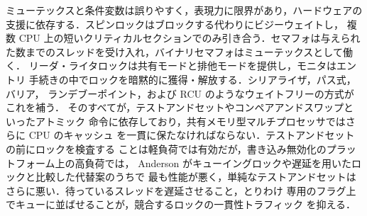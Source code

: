 \documentclass[../main.tex]{subfiles}
\begin{document}
\begin{keypoint}[章のまとめ]
  ミューテックスと条件変数は誤りやすく，表現力に限界があり，ハードウェアの
  支援に依存する．スピンロックはブロックする代わりにビジーウェイトし，
  複数 CPU 上の短いクリティカルセクションでのみ引き合う．セマフォは与えられ
  た数までのスレッドを受け入れ，バイナリセマフォはミューテックスとして働く．
  リーダ・ライタロックは共有モードと排他モードを提供し，モニタはエントリ
  手続きの中でロックを暗黙的に獲得・解放する．シリアライザ，パス式，バリア，
  ランデブーポイント，および RCU のようなウェイトフリーの方式がこれを補う．
  そのすべてが，テストアンドセットやコンペアアンドスワップといったアトミック
  命令に依存しており，共有メモリ型マルチプロセッサではさらに CPU のキャッシュ
  を一貫に保たなければならない．テストアンドセットの前にロックを検査する
  ことは軽負荷では有効だが，書き込み無効化のプラットフォーム上の高負荷では，
  Anderson がキューイングロックや遅延を用いたロックと比較した代替案のうちで
  最も性能が悪く，単純なテストアンドセットはさらに悪い．待っているスレッドを遅延させること，とりわけ
  専用のフラグ上でキューに並ばせることが，競合するロックの一貫性トラフィック
  を抑える．
\end{keypoint}
\end{document}
